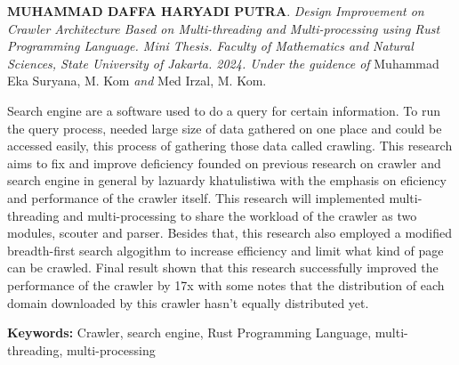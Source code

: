 \documentclass{jtetiskripsi}
\begin{document}
%
\begin{abstracteng}

  \textbf {MUHAMMAD DAFFA HARYADI PUTRA}. \emph{Design Improvement on Crawler Architecture Based on Multi-threading and Multi-processing using Rust Programming Language. Mini Thesis. Faculty of Mathematics and Natural Sciences, State University of Jakarta. 2024. Under the guidence of} Muhammad Eka Suryana, M. Kom \emph{and} Med Irzal, M. Kom.
\vskip1cm

  Search engine are a software used to do a query for certain information. To run the query process, needed large size of data gathered on one place and could be accessed easily, this process of gathering those data called crawling. This research aims to fix and improve deficiency founded on previous research on crawler and search engine in general by lazuardy khatulistiwa with the emphasis on eficiency and performance of the crawler itself. This research will implemented multi-threading and multi-processing to share the workload of the crawler as two modules, scouter and parser. Besides that, this research also employed a modified breadth-first search algogithm to increase efficiency and limit what kind of page can be crawled. Final result shown that this research successfully improved the performance of the crawler by 17x with some notes that the distribution of each domain downloaded by this crawler hasn't equally distributed yet.

\bigskip
\noindent
\textbf {Keywords:} Crawler, search engine, Rust Programming Language, multi-threading, multi-processing
\end{abstracteng}


\tableofcontents 
{}
\listoffigures
{}
\listoftables
{}

\begin{counterpage}
\end{counterpage}





\end{document}

